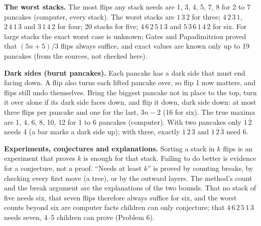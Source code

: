 \documentclass[11pt]{article}
\newcommand{\up}[1]{$\overline{#1}$}
\begin{document}
\textbf{The worst stacks.} The most flips any stack needs are 1, 3, 4, 5, 7, 8 for 2 to 7 pancakes (computer, every stack). The worst stacks are $1\,3\,2$ for three; $4\,2\,3\,1$, $2\,4\,1\,3$ and $3\,1\,4\,2$ for four; 20 stacks for five; $4\,6\,2\,5\,1\,3$ and $5\,3\,6\,1\,4\,2$ for six. For large stacks the exact worst case is unknown; Gates and Papadimitriou proved that $(5n+5)/3$ flips always suffice, and exact values are known only up to 19 pancakes (from the sources, not checked here).

\textbf{Dark sides (burnt pancakes).} Each pancake has a dark side that must end facing down. A flip also turns each lifted pancake over, so flip 1 now matters, and flips still undo themselves. Bring the biggest pancake not in place to the top, turn it over alone if its dark side faces down, and flip it down, dark side down: at most three flips per pancake and one for the last, $3n-2$ (16 for six). The true maxima are 1, 4, 6, 8, 10, 12 for 1 to 6 pancakes (computer). With two pancakes only \up1\,\up2 needs 4 (a bar marks a dark side up); with three, exactly \up1\,\up2\,\up3 and $1$\,\up2\,\up3 need 6.

\textbf{Experiments, conjectures and explanations.} Sorting a stack in $k$ flips is an experiment that proves $k$ is enough for that stack. Failing to do better is evidence for a conjecture, not a proof. ``Needs at least $k$'' is proved by counting breaks, by checking every first move (a tree), or by the outward layers. The method's count and the break argument are the explanations of the two bounds. That no stack of five needs six, that seven flips therefore always suffice for six, and the worst counts beyond six are computer facts children can only conjecture; that $4\,6\,2\,5\,1\,3$ needs seven, 4--5 children can prove (Problem 6).
\end{document}
